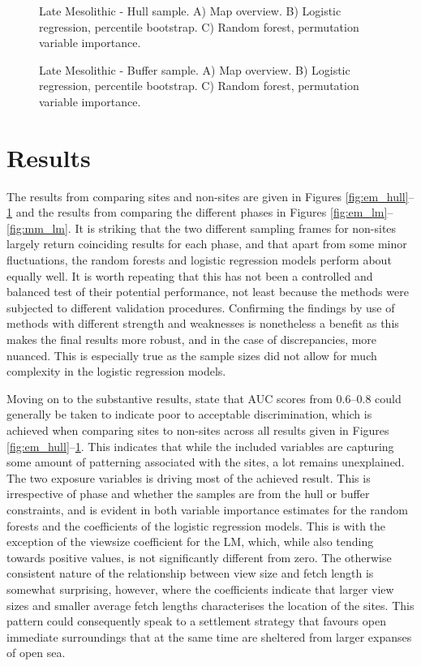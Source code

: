 \documentclass[12pt, a4paper]{article}
\begin{document}
\begin{figure}
	\caption[Late Mesolithic - Hull sample]{Late Mesolithic - Hull sample. A) Map overview. B) Logistic regression, percentile bootstrap. C) Random forest, permutation variable importance.}
	\label{fig:lm_hull}
\bigbreak
	\caption[Late Mesolithic - Buffer sample]{Late Mesolithic - Buffer sample. A) Map overview. B) Logistic regression, percentile bootstrap. C) Random forest, permutation variable importance.}
	\label{fig:lm_buff}
\end{figure}

\section{Results}
The results from comparing sites and non-sites are given in Figures \ref{fig:em_hull}--\ref{fig:lm_buff} and the results from comparing the different phases in Figures \ref{fig:em_lm}--\ref{fig:mm_lm}. It is striking that the two different sampling frames for non-sites largely return coinciding results for each phase, and that apart from some minor fluctuations, the random forests and logistic regression models perform about equally well. It is worth repeating that this has not been a controlled and balanced test of their potential performance, not least because the methods were subjected to different validation procedures. Confirming the findings by use of methods with different strength and weaknesses is nonetheless a benefit as this makes the final results more robust, and in the case of discrepancies, more nuanced. This is especially true as the sample sizes did not allow for much complexity in the logistic regression models.\par
Moving on to the substantive results, \citet[][177]{hosmer2013} state that AUC scores from 0.6--0.8 could generally be taken to indicate poor to acceptable discrimination, which is achieved when comparing sites to non-sites across all results given in Figures \ref{fig:em_hull}--\ref{fig:lm_buff}. This indicates that while the included variables are capturing some amount of patterning associated with the sites, a lot remains unexplained. The two exposure variables is driving most of the achieved result. This is irrespective of phase and whether the samples are from the hull or buffer constraints, and is evident in both variable importance estimates for the random forests and the coefficients of the logistic regression models. This is with the exception of the viewsize coefficient for the LM, which, while also tending towards positive values, is not significantly different from zero. The otherwise consistent nature of the relationship between view size and fetch length is somewhat surprising, however, where the coefficients indicate that larger view sizes and smaller average fetch lengths characterises the location of the sites. This pattern could consequently speak to a settlement strategy that favours open immediate surroundings that at the same time are sheltered from larger expanses of open sea.\par 
\end{document}
